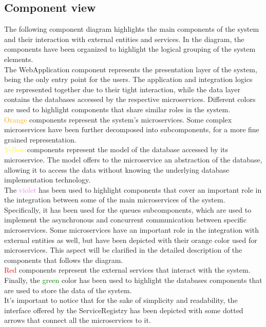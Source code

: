 \subsection{Component view}
The following component diagram highlights the main components of the system and their interaction with external entities and services. In the diagram, the components have 
been organized to highlight the logical grouping of the system elements.\\The WebApplication component represents the presentation layer of the system, being the only entry point for the users.
The application and integration logics are represented together due to their tight interaction, while the data layer contains the databases accessed by the respective microservices.
Different colors are used to highlight components that share similar roles in the system.\\ \textcolor{orange}{Orange} components represent the system's microservices. Some complex microservices have been further decomposed into subcomponents, for a more fine grained representation.\\
\textcolor{yellow}{Yellow} components represent the model of the database accessed by its microservice. The model offers to the microservice an abstraction of the database, allowing it to access the data without knowing the underlying database implementation technology.\\ 
The \textcolor{violet}{violet} has been used to highlight components that cover an important role in the integration between some of the main microservices of the system. Specifically, it has been used for the queues subcomponents, which are used to implement the asynchronous and concurrent communication between specific microservices.
Some microservices have an important role in the integration with external entities as well, but have been depicted with their orange color used for microservices. This aspect will be clarified in the detailed description of the components that follows the diagram.\\
\textcolor{red}{Red} components represent the external services that interact with the system.\\
Finally, the \textcolor{green}{green} color has been used to highlight the databases components that are used to store the data of the system.\\
It's important to notice that for the sake of simplicity and readability, the interface offered by the ServiceRegistry has been depicted with some dotted arrows that connect all the microservices to it.

